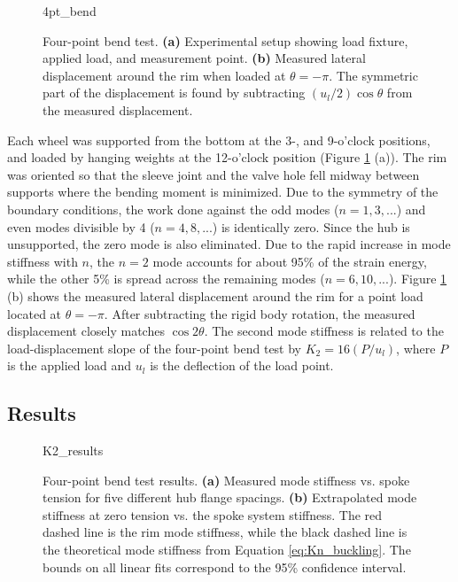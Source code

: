 \documentclass[\rootdir/thesis.tex]{subfiles}
\begin{document}
\begin{figure}[t]
\centering
{4pt_bend}
\caption{Four-point bend test. \textbf{(a)} Experimental setup showing load fixture, applied load, and measurement point. \textbf{(b)} Measured lateral displacement around the rim when loaded at $\theta=-\pi$. The symmetric part of the displacement is found by subtracting $(u_l/2)\cos{\theta}$ from the measured displacement.}
\label{fig:4pt_bend_setup}
\end{figure}

Each wheel was supported from the bottom at the 3-, and 9-o'clock positions, and loaded by hanging weights at the 12-o'clock position (Figure \ref{fig:4pt_bend_setup} (a)). The rim was oriented so that the sleeve joint and the valve hole fell midway between supports where the bending moment is minimized. Due to the symmetry of the boundary conditions, the work done against the odd modes ($n=1, 3, ...$) and even modes divisible by 4 ($n=4, 8, ...$) is identically zero. Since the hub is unsupported, the zero mode is also eliminated. Due to the rapid increase in mode stiffness with $n$, the $n=2$ mode accounts for about 95\% of the strain energy, while the other 5\% is spread across the remaining modes ($n=6, 10, ...$). Figure \ref{fig:4pt_bend_setup} (b) shows the measured lateral displacement around the rim for a point load located at $\theta=-\pi$. After subtracting the rigid body rotation, the measured displacement closely matches $\cos{2\theta}$. The second mode stiffness is related to the load-displacement slope of the four-point bend test by $K_2 = 16(P/u_l)$, where $P$ is the applied load and $u_l$ is the deflection of the load point.

\subsection{Results}
\label{sec:K2_T_results}

\begin{figure}[t]
\centering
{K2_results}
\caption{Four-point bend test results. \textbf{(a)} Measured mode stiffness vs. spoke tension for five different hub flange spacings. \textbf{(b)} Extrapolated mode stiffness at zero tension vs. the spoke system stiffness. The red dashed line is the rim mode stiffness, while the black dashed line is the theoretical mode stiffness from Equation \eqref{eq:Kn_buckling}. The bounds on all linear fits correspond to the 95\% confidence interval.}
\label{fig:K2_results}
\end{figure}
\end{document}
